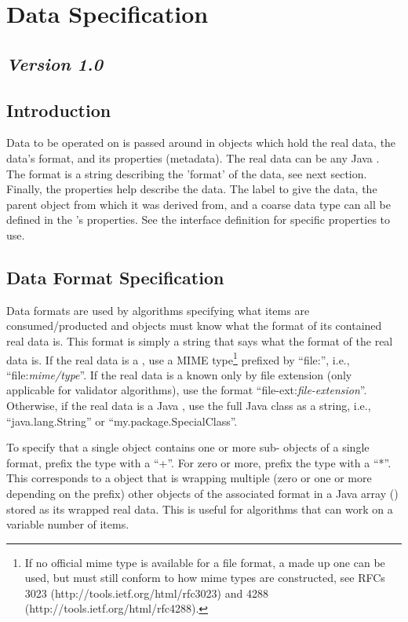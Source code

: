 \section{Data Specification}
\label{dataSpec}
\subsection*{\textit{Version 1.0}}
\subsection{Introduction}

Data to be operated on is passed around in  objects which hold the
real data, the data's format, and its properties (metadata). The real data can be
any Java . The format is a string describing the 'format' of the
data, see next section. Finally, the properties help describe the data. The label
to give the data, the parent  object from which it was derived from,
and a coarse data type can all be defined in the 's properties. See
the  interface definition for specific properties to use.

\subsection{Data Format Specification}

Data formats are used by algorithms specifying what  items are
consumed/producted and  objects must know what the format of its
contained real data is. This format is simply a string that says what the
format of the real data is. If the real data is a , use a
MIME type\footnote{If no official mime type is available for a file format, a
made up one can be used, but must still conform to how mime types are
constructed, see RFCs 3023 (http://tools.ietf.org/html/rfc3023) and 4288
(http://tools.ietf.org/html/rfc4288).} prefixed by ``file:'', i.e.,
``file:\textit{mime/type}''. If the real data is a  known
only by file extension (only applicable for validator algorithms), use the format
``file-ext:\textit{file-extension}''. Otherwise, if the real data is a Java
, use the full Java class as a string, i.e., ``java.lang.String''
or ``my.package.SpecialClass''.

To specify that a single  object contains one or more
sub- objects of a single format, prefix the type with a ``+''. For
zero or more, prefix the type with a ``*''. This corresponds to a 
object that is wrapping multiple (zero or one or more depending on the prefix)
other  objects of the associated format in a Java array
() stored as its wrapped real data. This is useful for algorithms
that can work on a variable number of  items.
